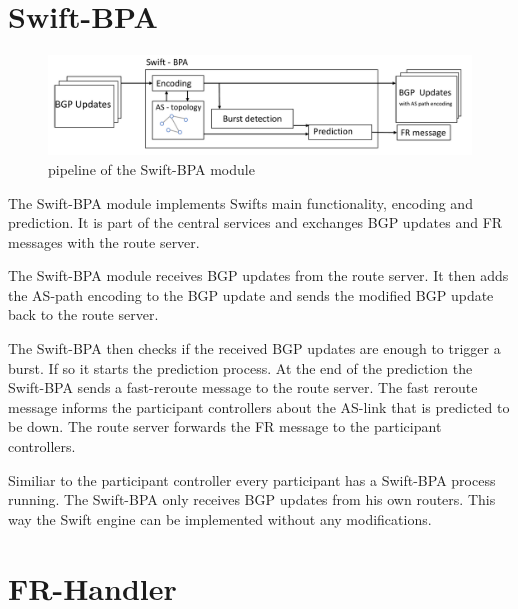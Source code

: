 \section{\label{chapter3:Swift-BPA}Swift-BPA}

\begin{figure}[h]
\center
\includegraphics[scale = 0.5]{Figures/design_swift_bpa_cropped.pdf}
\caption{pipeline of the Swift-BPA module}
\end{figure}

The Swift-BPA module implements Swifts main functionality, encoding and prediction. It is part of the central services and exchanges BGP updates and FR messages with the route server.

The Swift-BPA module receives BGP updates from the route server. It then adds the AS-path encoding to the BGP update and sends the modified BGP update back to the route server.

The Swift-BPA then checks if the received BGP updates are enough to trigger a burst. If so it starts the prediction process. At the end of the prediction the Swift-BPA sends a fast-reroute message to the route server. The fast reroute message informs the participant controllers about the AS-link that is predicted to be down. The route server forwards the FR message to the participant controllers.

Similiar to the participant controller every participant has a Swift-BPA process running. The Swift-BPA only receives BGP updates from his own routers. This way the Swift engine can be implemented without any modifications.

\section{\label{chapter3:FR-handler}FR-Handler}

